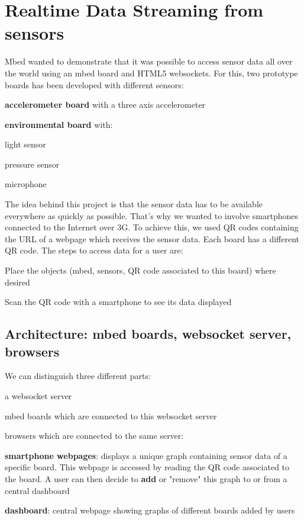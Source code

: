 \documentclass[pdftex,10pt,a4paper]{report}
\newenvironment{packed_item}{
\begin{itemize}
  \setlength{\itemsep}{1pt}
  \setlength{\parskip}{0pt}
  \setlength{\parsep}{0pt}
}{\end{itemize}}
\begin{document}
\newpage

\section{Realtime Data Streaming from sensors}
Mbed wanted to demonstrate that it was possible to access sensor data all over the world using an mbed board and HTML5 websockets. For this, two prototype boards has been developed with different sensors:

\begin{packed_item}
	\item \textbf{accelerometer board} with a three axis accelerometer
	\item \textbf{environmental board} with:
		\begin{packed_item}
			\item light sensor
			\item pressure sensor
			\item microphone
		\end{packed_item}
\end {packed_item}

The idea behind this project is that the sensor data has to be available everywhere as quickly as possible. That's why we wanted to involve smartphones connected to the Internet over 3G. To achieve this, we used QR codes containing the URL of a webpage which receives the sensor data. Each board has a different QR code. The steps to access data for a user are:

\begin{packed_item}
	\item Place the objects (mbed, sensors, QR code associated to this board) where desired
	\item Scan the QR code with a smartphone to see its data displayed
\end{packed_item}


\subsection{Architecture: mbed boards, websocket server, browsers}
We can distinguish three different parts:
\begin{packed_item}
	\item a websocket server
	\item mbed boards which are connected to this websocket server
	\item browsers which are connected to the same server:
	\begin{packed_item}
		\item \textbf{smartphone webpages}: displays a unique graph containing sensor data of a specific board. This webpage is accessed by reading the QR code associated to the board. A user can then decide to \textbf{add} or "remove" this graph to or from a central dashboard
		\item \textbf{dashboard}: central webpage showing graphs of different boards added by users
	\end{packed_item}
\end{packed_item}
\end{document}
